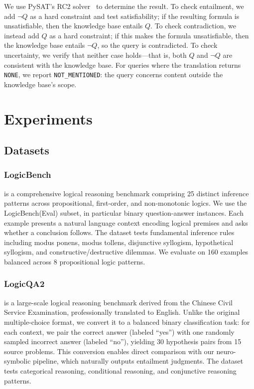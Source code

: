 \documentclass{article} %
\begin{document}
We use PySAT's RC2 solver~\citep{ignatiev2019rc2} to determine the result. To check entailment, we add $\neg Q$ as a hard constraint and test satisfiability; if the resulting formula is unsatisfiable, then the knowledge base entails $Q$. To check contradiction, we instead add $Q$ as a hard constraint; if this makes the formula unsatisfiable, then the knowledge base entails $\neg Q$, so the query is contradicted. To check uncertainty, we verify that neither case holds---that is, both $Q$ and $\neg Q$ are consistent with the knowledge base. For queries where the translation returns \texttt{NONE}, we report \texttt{NOT\_MENTIONED}: the query concerns content outside the knowledge base's scope.

\section{Experiments} 
\subsection{Datasets}
\subsubsection{LogicBench} 
\citep{parmar2024logicbench} is a comprehensive logical reasoning benchmark comprising 25 distinct inference patterns across propositional, first-order, and non-monotonic logics. We use the LogicBench(Eval) subset, in particular binary question-answer instances. Each example presents a natural language context encoding logical premises and asks whether a conclusion follows. The dataset tests fundamental inference rules including modus ponens, modus tollens, disjunctive syllogism, hypothetical syllogism, and constructive/destructive dilemmas. We evaluate on 160 examples balanced across 8 propositional logic patterns. 



\subsubsection{LogicQA2}
\citep{liu2023logiqa2} is a large-scale logical reasoning benchmark derived from the Chinese Civil Service Examination, professionally translated to English. Unlike the original multiple-choice format, we convert it to a balanced binary classification task: for each context, we pair the correct answer (labeled ``yes'') with one randomly sampled incorrect answer (labeled ``no''), yielding 30 hypothesis pairs from 15 source problems. This conversion enables direct comparison with our neuro-symbolic pipeline, which naturally outputs entailment judgments. The dataset tests categorical reasoning, conditional reasoning, and conjunctive reasoning patterns.
\end{document}
